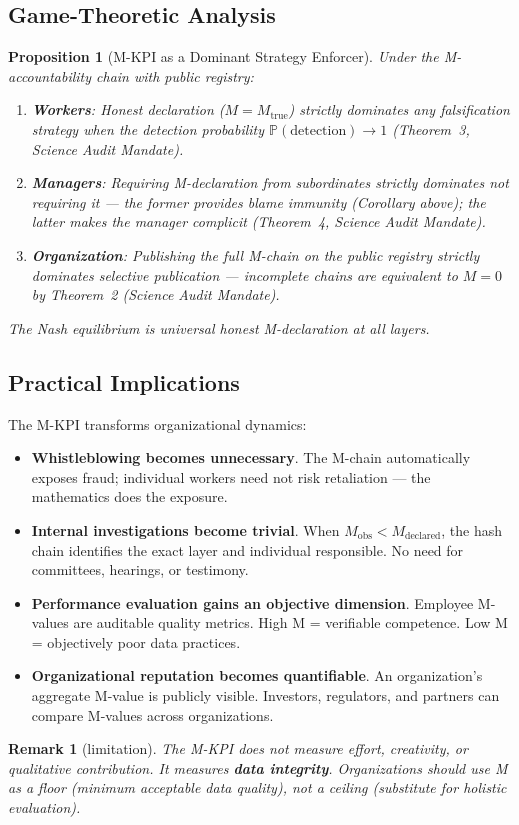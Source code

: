 \documentclass[11pt,a4paper]{article}
\newtheorem{proposition}[theorem]{Proposition}
\newtheorem{remark}[theorem]{Remark}
\theoremstyle{definition}
\begin{document}
\subsection{Game-Theoretic Analysis}
\begin{proposition}[M-KPI as a Dominant Strategy Enforcer]
\label{prop:m-kpi-dominant}
Under the M-accountability chain with public registry:
\begin{enumerate}[label=(\roman*)]
    \item \textbf{Workers}: Honest declaration ($M = M_{\text{true}}$) strictly dominates any falsification strategy when the detection probability $\mathbb{P}(\text{detection}) \to 1$ (Theorem~3, Science Audit Mandate).
    \item \textbf{Managers}: Requiring M-declaration from subordinates strictly dominates not requiring it — the former provides blame immunity (Corollary above); the latter makes the manager complicit (Theorem~4, Science Audit Mandate).
    \item \textbf{Organization}: Publishing the full M-chain on the public registry strictly dominates selective publication — incomplete chains are equivalent to $M=0$ by Theorem~2 (Science Audit Mandate).
\end{enumerate}
The Nash equilibrium is universal honest M-declaration at all layers.
\end{proposition}
\subsection{Practical Implications}
The M-KPI transforms organizational dynamics:
\begin{itemize}[nosep]
    \item \textbf{Whistleblowing becomes unnecessary}. The M-chain automatically exposes fraud; individual workers need not risk retaliation — the mathematics does the exposure.
    \item \textbf{Internal investigations become trivial}. When $M_{\text{obs}} < M_{\text{declared}}$, the hash chain identifies the exact layer and individual responsible. No need for committees, hearings, or testimony.
    \item \textbf{Performance evaluation gains an objective dimension}. Employee M-values are auditable quality metrics. High M = verifiable competence. Low M = objectively poor data practices.
    \item \textbf{Organizational reputation becomes quantifiable}. An organization's aggregate M-value is publicly visible. Investors, regulators, and partners can compare M-values across organizations.
\end{itemize}
\begin{remark}[limitation]
The M-KPI does not measure effort, creativity, or qualitative contribution. It measures \textbf{data integrity}. Organizations should use M as a floor (minimum acceptable data quality), not a ceiling (substitute for holistic evaluation).
\end{remark}
\label{sec:discussion}
\end{document}
